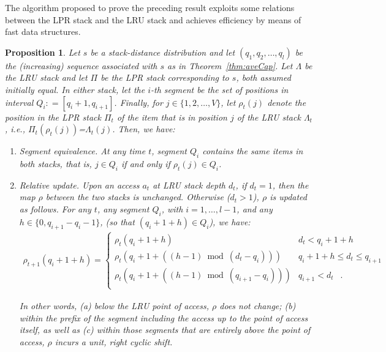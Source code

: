 \documentclass[11pt,a4paper]{article}
\DeclareMathOperator{\mf}{\enspace .}
\newcommand{\deq}{\mathrel{\mathop:}=}
\newtheorem{proposition}{Proposition}
\theoremstyle{definition}
\theoremstyle{remark}
\begin{document}
The algorithm proposed to prove the preceding result exploits some
relations between the LPR stack and the LRU stack and achieves
efficiency by means of fast data structures.

\begin{proposition}\label{thm:lru-lpr}
  Let $s$ be a stack-distance distribution and let $(q_1, q_2, \ldots,
  q_l)$ be the (increasing) sequence associated with $s$ as in
  Theorem~\ref{thm:aveCap}. Let $\Lambda$ be the LRU stack and let
  $\Pi$ be the LPR stack corresponding to $s$, both assumed initially
  equal. In either stack, let the $i$-th segment be the set of
  positions in interval $Q_i\deq[q_i+1, q_{i+1}]$. Finally, for $j \in
  \{1,2, \ldots, V\}$, let $\rho_t(j)$ denote the position in the LPR
  stack $\Pi_t$ of the item that is in position $j$ of the LRU stack
  $\Lambda_t$, i.e., $\Pi_t(\rho_t(j))$=$\Lambda_t(j)$. Then,
  we have:

  \begin{enumerate}
   
  \item {\sc Segment equivalence.} At any time $t$, segment $Q_i$
  contains the same items in both stacks, that is, $j \in Q_i$ if and
  only if $\rho_t(j) \in Q_i$.

  \item {\sc Relative update.} Upon an access $a_t$ at LRU stack
  depth $d_t$, if $d_t=1$, then the map $\rho$ between the two
  stacks is unchanged. Otherwise ($d_t>1$), $\rho$ is updated as
  follows. For any $t$, any segment $Q_i$, with $i=1,\ldots, l-1$, and
  any $h \in \{0, q_{i+1}-q_i-1\}$, (so that $(q_i+1+h) \in Q_i$), we
  have:
\begin{align}
      \rho_{t+1}(q_i+1+h)= \begin{cases} \rho_{t}(q_i+1+h) & d_t < q_i+1+h\\ 
   \rho_{t}\left(q_i+1 + \left((h-1) \bmod (d_t-q_i) \right) \right) 
      & q_i +1 +h \leq d_t \leq q_{i+1} \\
   \rho_{t}\left(q_i +1 + \left( (h-1) \bmod (q_{i+1}-q_i) \right) \right) 
      & q_{i+1} < d_t \mf \\  
  \end{cases}
\end{align} 

  In other words, (a) below the LRU point of access, $\rho$ does not
  change; (b) within the prefix of the segment including the access
  up to the point of access itself, as well as (c) within those
  segments that are entirely above the point of access, $\rho$ incurs
  a unit, right cyclic shift.  \end{enumerate}
\end{proposition}
  
\end{document}
